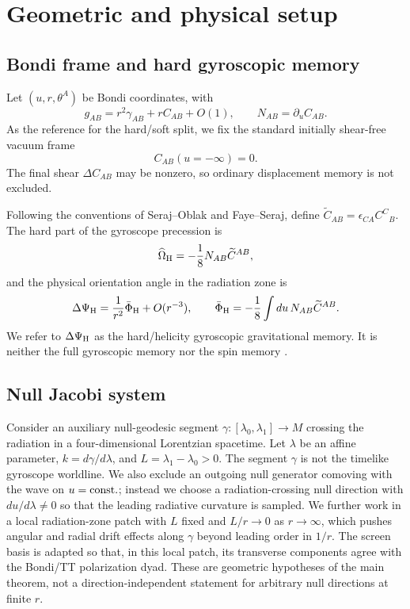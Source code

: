 \section{Geometric and physical setup}
\subsection{Bondi frame and hard gyroscopic memory}
Let $(u,r,\theta^A)$ be Bondi coordinates, with
\[
g_{AB}=r^2\gamma_{AB}+rC_{AB}+O(1),\qquad N_{AB}=\partial_u C_{AB}.
\]
As the reference for the hard/soft split, we fix the standard initially shear-free vacuum frame
\begin{equation}
C_{AB}(u=-\infty)=0.
\label{eq:early-shear-free}
\end{equation}
The final shear $\Delta C_{AB}$ may be nonzero, so ordinary displacement memory is not excluded.

Following the conventions of Seraj--Oblak and Faye--Seraj, define $\widetilde C_{AB}=\epsilon_{CA}C^C{}_B$. The hard part of the gyroscope precession is
\begin{equation}
\widehat\Omega_{\rm H}=-\frac18N_{AB}\widetilde C^{AB},
\label{eq:hard-precession}
\end{equation}
and the physical orientation angle in the radiation zone is
\begin{equation}
\Delta\Psi_{\rm H}=\frac{1}{r^2}\bar\Phi_{\rm H}+O(r^{-3}),\qquad
\bar\Phi_{\rm H}=-\frac18\int du\,N_{AB}\widetilde C^{AB}.
\label{eq:hard-memory}
\end{equation}
We refer to $\Delta\Psi_{\rm H}$ as the hard/helicity gyroscopic gravitational memory. It is neither the full gyroscopic memory nor the spin memory \cite{SerajOblak2023,FayeSeraj2025}.

\subsection{Null Jacobi system}
Consider an auxiliary null-geodesic segment $\gamma:[\lambda_0,\lambda_1]\to M$ crossing the radiation in a four-dimensional Lorentzian spacetime. Let $\lambda$ be an affine parameter, $k=d\gamma/d\lambda$, and $L=\lambda_1-\lambda_0>0$. The segment $\gamma$ is not the timelike gyroscope worldline. We also exclude an outgoing null generator comoving with the wave on $u={\rm const.}$; instead we choose a radiation-crossing null direction with $du/d\lambda\neq0$ so that the leading radiative curvature is sampled. We further work in a local radiation-zone patch with $L$ fixed and $L/r\to0$ as $r\to\infty$, which pushes angular and radial drift effects along $\gamma$ beyond leading order in $1/r$. The screen basis is adapted so that, in this local patch, its transverse components agree with the Bondi/TT polarization dyad. These are geometric hypotheses of the main theorem, not a direction-independent statement for arbitrary null directions at finite $r$.

